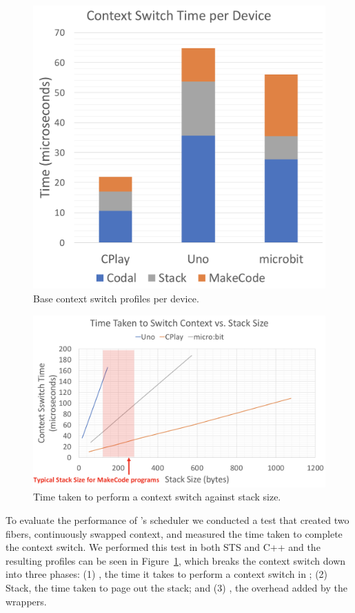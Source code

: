 \begin{figure}[ht]
    \includegraphics[width=.7\columnwidth]{images/context-switch.png}
\caption{\label{fig:context-switch}Base context switch profiles per device.}
\end{figure}

\begin{figure}[ht]
    \includegraphics[width=.99\columnwidth]{images/context-vs-stack.png}
\caption{\label{fig:context-vs-stack}Time taken to perform a context switch against stack size.}
\end{figure}

To evaluate the performance of \CON's scheduler we conducted a test that created two fibers, continuously swapped context, and measured the time taken to complete the context switch.
We performed this test in both STS and C++ and the resulting profiles can be seen in Figure~\ref{fig:context-switch}, which
breaks the context switch down into three phases:
(1) \CON, the time it takes to perform a context switch in \CON;
(2) Stack, the time taken to page out the \MC stack; and
(3) \MCN, the overhead added by the \MC wrappers.

